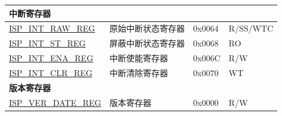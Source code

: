 \begin{longtable}{ | p{6cm} | p{7.2cm} | p{1.3cm} | p{1cm} | }
\multicolumn{4}{|l|}{\textbf{中断寄存器}} \\ \hline
\hyperref[regdesc:ISPINTRAWREG]{ISP\_INT\_RAW\_REG} & 原始中断状态寄存器 & 0x0064 & R/SS/WTC \\ \hline
\hyperref[regdesc:ISPINTSTREG]{ISP\_INT\_ST\_REG} & 屏蔽中断状态寄存器 & 0x0068 & RO \\ \hline
\hyperref[regdesc:ISPINTENAREG]{ISP\_INT\_ENA\_REG} & 中断使能寄存器 & 0x006C & R/W \\ \hline
\hyperref[regdesc:ISPINTCLRREG]{ISP\_INT\_CLR\_REG} & 中断清除寄存器 & 0x0070 & WT \\ \hline
\multicolumn{4}{|l|}{\textbf{版本寄存器}} \\ \hline
\hyperref[regdesc:ISPVERDATEREG]{ISP\_VER\_DATE\_REG} & 版本寄存器 & 0x0000 & R/W \\ \hline
\end{longtable}

